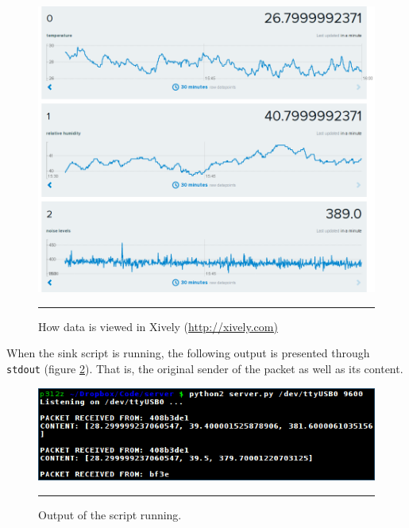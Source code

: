 \begin{figure}[htbp]
    \centering
        \includegraphics[scale=0.4]{./Figures/xivelyup.png}
        \rule{35em}{0.5pt}
    \caption[Data uploaded to Xively]{How data is viewed in Xively (\url{http://xively.com)}}
    \label{fig:datos_subidos}
\end{figure}

When the sink script is running, the following output is presented through \texttt{stdout} (figure \ref{fig:stdout}). That is, the original sender of the packet as well as its content.

\begin{figure}[htbp]
    \centering
        \includegraphics[scale=0.6]{./Figures/terminal.png}
        \rule{35em}{0.5pt}
    \caption[Output of the daemon]{Output of the script running.}
    \label{fig:stdout}
\end{figure}

